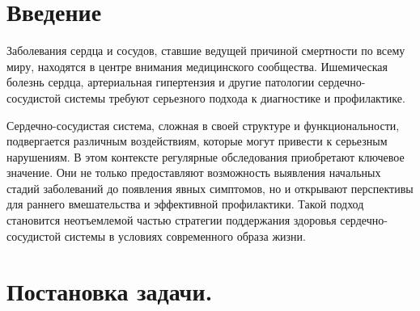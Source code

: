 \documentclass[12pt, russian]{extarticle}
\begin{document}
    \begin{spacing}{1.5}


    \tableofcontents
    \thispagestyle{empty}
    \newpage

    \pagestyle{plain}
    \setcounter{page}{3}

    \newpage
    \section{Введение}

    Заболевания сердца и сосудов, ставшие ведущей причиной смертности по всему миру,
    находятся в центре внимания медицинского сообщества. Ишемическая болезнь сердца,
    артериальная гипертензия и другие патологии сердечно-сосудистой системы требуют
    серьезного подхода к диагностике и профилактике.

    Сердечно-сосудистая система, сложная в своей структуре и функциональности,
    подвергается различным воздействиям, которые могут привести к серьезным нарушениям.
    В этом контексте регулярные обследования приобретают ключевое значение. Они не только
    предоставляют возможность выявления начальных стадий заболеваний до появления явных
    симптомов, но и открывают перспективы для раннего вмешательства и эффективной
    профилактики. Такой подход становится неотъемлемой частью стратегии поддержания
    здоровья сердечно-сосудистой системы в условиях современного образа жизни.

    \newpage
    \section{Постановка задачи.}


\end{spacing}
\end{document}
